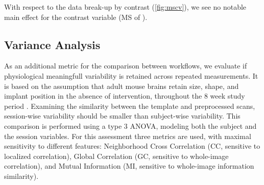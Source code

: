 With respect to the data break-up by contrast (\cref{fig:mscv}), we see no notable main effect for the contrast variable
(MS of ).
%

\subsection{Variance Analysis}

\begin{sansmath}
\end{sansmath}

As an additional metric for the comparison between workflows, we evaluate if physiological meaningfull variability is retained across repeated measurements.
It is based on the assumption that adult mouse brains retain size, shape, and implant position in the absence of intervention, throughout the 8 week study period \cite{ioanas_optimized_2019}.
Examining the similarity between the template and preprocessed scans, session-wise variability should be smaller than subject-wise variability.
This comparison is performed using a type 3 ANOVA, modeling both the subject and the session variables.
For this assessment three metrics are used, with maximal sensitivity to different features:
Neighborhood Cross Correlation (CC, sensitive to localized correlation),
Global Correlation (GC, sensitive to whole-image correlation),
and Mutual Information (MI, sensitive to whole-image information similarity).

